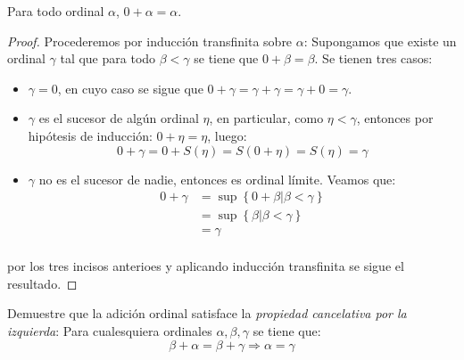 \documentclass[12pt]{report}
\newcounter{it}
\theoremstyle{largebreak}
\begin{document}
    \begin{excer}
        Para todo ordinal $\alpha$, $0+\alpha=\alpha$.
    \end{excer}

    \begin{proof}
        Procederemos por inducción transfinita sobre $\alpha$: Supongamos que existe un ordinal $\gamma$ tal que para todo $\beta<\gamma$ se tiene que $0+\beta=\beta$. Se tienen tres casos:
        \begin{itemize}
            \item $\gamma=0$, en cuyo caso se sigue que $0+\gamma=\gamma+\gamma=\gamma+0=\gamma$.
            \item $\gamma$ es el sucesor de algún ordinal $\eta$, en particular, como $\eta<\gamma$, entonces por hipótesis de inducción: $0+\eta=\eta$, luego:
            \begin{equation*}
                0+\gamma=0+S(\eta)=S(0+\eta)=S(\eta)=\gamma
            \end{equation*}
            \item $\gamma$ no es el sucesor de nadie, entonces es ordinal límite. Veamos que:
            \begin{equation*}
                \begin{split}
                    0+\gamma&=\sup\left\{0+\beta\Big|\beta<\gamma \right\}\\
                    &=\sup\left\{\beta\Big|\beta<\gamma \right\}\\
                    &=\gamma\\
                \end{split}
            \end{equation*}
        \end{itemize}
        por los tres incisos anterioes y aplicando inducción transfinita se sigue el resultado.
    \end{proof}

    \begin{excer}
        Demuestre que la adición ordinal satisface la \textit{propiedad cancelativa por la izquierda}: Para cualesquiera ordinales $\alpha,\beta,\gamma$ se tiene que:
        \begin{equation*}
            \beta+\alpha=\beta+\gamma\Rightarrow\alpha=\gamma
        \end{equation*}
    \end{excer}
\end{document}
